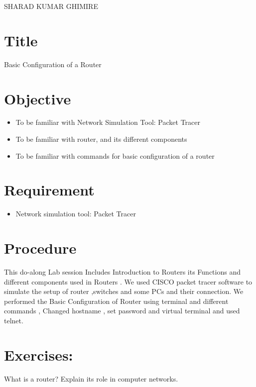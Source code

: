 \documentclass[a4paper,12pt]{article}
\begin{document}
{SHARAD KUMAR GHIMIRE}

\renewcommand{\contentsname}{Table of Contents}
\tableofcontents

\pagebreak
\lstlistoflistings
\pagebreak
{}

\section{Title} {\large Basic Configuration of a Router}
\section{Objective}
\begin{itemize}
      \item To be familiar with Network Simulation Tool: Packet Tracer
      \item To be familiar with router, and its different components
      \item To be familiar with commands for basic configuration of a router
\end{itemize}
\section{Requirement}
\begin{itemize}
      \item Network simulation tool: Packet Tracer
\end{itemize}

\section{Procedure}
This do-along Lab session Includes Introduction to Routers its Functions and different components used in Routers . We used CISCO packet tracer software to simulate the setup of router ,switches and some PCs and their connection. We performed the Basic Configuration of Router using terminal and different commands , Changed hostname , set password and virtual terminal and used telnet.


\pagebreak
\section{Exercises:}
\begin{Q}
      {
            What is a router? Explain its role in computer networks.
      }
\end{Q}
\end{document}
